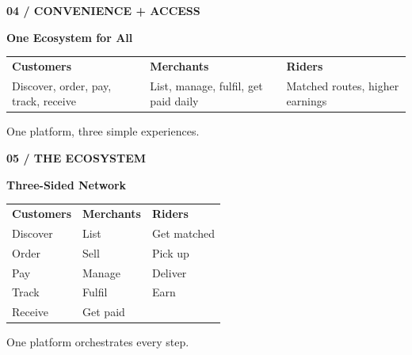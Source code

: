 \documentclass[aspectratio=169,11pt]{beamer}
\begin{document}
\begin{frame}
\textsf{\scriptsize\bfseries\color{LinkBlue}\uppercase{04 / Convenience + Access}}
\vspace{0.2cm}

{\fontsize{22}{28}\sffamily\bfseries\color{CorporateNavy} One Ecosystem for All}

\vspace{0.8cm}
\begin{tabularx}{\textwidth}{@{} X X X @{}}
    \textsf{\small\bfseries\color{CorporateNavy} Customers} & \textsf{\small\bfseries\color{CorporateNavy} Merchants} & \textsf{\small\bfseries\color{CorporateNavy} Riders} \\
    \textsf{\small Discover, order, pay, track, receive} & \textsf{\small List, manage, fulfil, get paid daily} & \textsf{\small Matched routes, higher earnings}
\end{tabularx}
\vspace{0.4cm}
\textsf{\small One platform, three simple experiences.}
\end{frame}

\begin{frame}
\textsf{\scriptsize\bfseries\color{LinkBlue}\uppercase{05 / The Ecosystem}}
\vspace{0.2cm}

{\fontsize{22}{28}\sffamily\bfseries\color{CorporateNavy} Three-Sided Network}

\vspace{0.8cm}
\begin{tabularx}{\textwidth}{@{} X X X @{}}
    \textsf{\small\bfseries\color{CorporateNavy} Customers} & \textsf{\small\bfseries\color{CorporateNavy} Merchants} & \textsf{\small\bfseries\color{CorporateNavy} Riders} \\
    \textsf{\small Discover} & \textsf{\small List} & \textsf{\small Get matched} \\
    \textsf{\small Order} & \textsf{\small Sell} & \textsf{\small Pick up} \\
    \textsf{\small Pay} & \textsf{\small Manage} & \textsf{\small Deliver} \\
    \textsf{\small Track} & \textsf{\small Fulfil} & \textsf{\small Earn} \\
    \textsf{\small Receive} & \textsf{\small Get paid} & 
\end{tabularx}
\vspace{0.4cm}
\textsf{\small One platform orchestrates every step.}
\end{frame}
\end{document}

